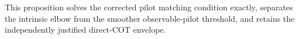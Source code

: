This proposition solves the corrected pilot matching condition exactly, separates the intrinsic elbow from the smoother observable-pilot threshold, and retains the independently justified direct-COT envelope.